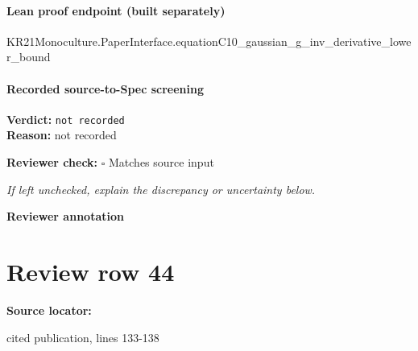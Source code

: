 \documentclass[10pt]{article}
\newcommand{\reviewerbox}{%
  \par\noindent\fbox{\parbox{0.96\linewidth}{\rule{0pt}{0.38in}}}\par
}
\newcommand{\reviewmatch}[1]{%
  \par\noindent\textbf{Reviewer check:} $\square$\; #1\par
  \noindent\emph{If left unchecked, explain the discrepancy or uncertainty below.}\par
}
\begin{document}
\paragraph{Lean proof endpoint (built separately)}\begin{ReviewVerbatim}
KR21Monoculture.PaperInterface.equationC10_gaussian_g_inv_derivative_lower_bound
\end{ReviewVerbatim}

\paragraph{Recorded source-to-Spec screening}
\textbf{Verdict:} \texttt{not recorded}
\\
\textbf{Reason:} not recorded
\reviewmatch{Matches source input}
\noindent\textbf{Reviewer annotation}\par
\reviewerbox
\clearpage
\hypertarget{source-claim-d732fbc16f2ecdeb}{}
\section*{Review row 44}
\textbf{Source locator:} {\footnotesize\raggedright cited publication, lines 133-\allowbreak{}138\par}
\end{document}
